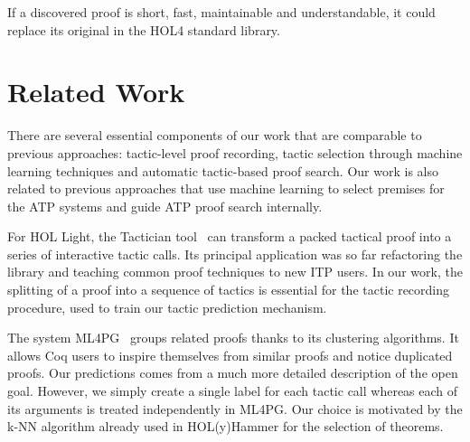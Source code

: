 \documentclass[runningheads,a4paper,draft]{svjour3}
\def\holfour{\textsf{HOL4}\xspace}
\def\hollight{\textsf{HOL Light}\xspace}
\def\coq{\textsf{Coq}\xspace}
\def\holyhammer{\textsf{HOL(y)Hammer}\xspace}
\begin{document}
If a discovered proof is short, fast, maintainable and 
understandable, it could replace its original in the \holfour standard library.


\section{Related Work}
There are several essential components of our work that are comparable to 
previous approaches: tactic-level proof recording, tactic 
selection through machine learning techniques and automatic tactic-based proof 
search. Our work is also related to previous approaches that use machine 
learning to select premises for the ATP systems and guide ATP proof search 
internally.

For \hollight, the Tactician tool~\cite{DBLP:conf/sefm/Adams15} 
can transform a packed tactical proof into a series of interactive tactic 
calls. Its principal application 
was so far refactoring the library and teaching common proof techniques to new 
ITP users. In our work, the splitting of a proof into a sequence of tactics is 
essential for the
tactic recording procedure, used to train our tactic prediction mechanism.

The system 
\textsf{ML4PG}~\cite{DBLP:journals/corr/abs-1212-3618,DBLP:journals/mics/HerasK14}
groups related proofs thanks to its clustering 
algorithms. It allows \coq users to inspire themselves from similar proofs and 
notice 
duplicated proofs. Our predictions comes from a much more detailed description 
of the open goal.
However, we simply create a single label for each tactic call whereas each of 
its
arguments is treated independently in \textsf{ML4PG}. 
Our choice is motivated by the k-NN algorithm already used in
\holyhammer for the selection of theorems.
\end{document}

